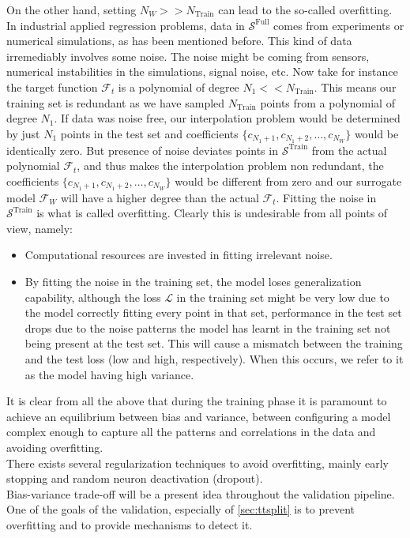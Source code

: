 \indent On the other hand, setting $N_W>>N_{\text{Train}}$ can lead to the so-called overfitting. In industrial applied regression problems, data in $\mathcal{S}^\text{Full}$ comes from experiments or numerical simulations, as has been mentioned before. This kind of data irremediably involves some noise. The noise might be coming from sensors, numerical instabilities in the simulations, signal noise, etc. Now take for instance the target function $\mathcal{F}_t$ is a polynomial of degree $N_1<<N_{\text{Train}}$. This means our training set is redundant as we have sampled $N_\text{Train}$ points from a polynomial of degree $N_1$. If data was noise free, our interpolation problem would be determined by just $N_1$ points in the test set and coefficients $\{c_{N_1+1},c_{N_1+2},\ldots,c_{N_W}\}$ would be identically zero. But presence of noise deviates points in $\mathcal{S}^\text{Train}$ from the actual polynomial $\mathcal{F}_t$, and thus makes the interpolation problem non redundant, \ie the coefficients $\{c_{N_1+1},c_{N_1+2},\ldots,c_{N_W}\}$ would be different from zero and our surrogate model $\mathcal{{F}}_W$ will have a higher degree than the actual $\mathcal{F}_t$. Fitting the noise in $\mathcal{S}^\text{Train}$ is what is called overfitting. Clearly this is undesirable from all points of view, namely:
\begin{itemize}
	\item Computational resources are invested in fitting irrelevant noise.
	\item By fitting the noise in the training set, the model loses generalization capability, \ie although the loss $\mathcal{L}$ in the training set might be very low due to the model correctly fitting every point in that set, performance in the test set drops due to the noise patterns the model has learnt in the training set not being present at the test set. This will cause a mismatch between the training and the test loss (low and high, respectively). When this occurs, we refer to it as the model having high variance.
\end{itemize}

It is clear from all the above that during the training phase it is paramount to achieve an equilibrium between bias and variance, \ie between configuring a model complex enough to capture all the patterns and correlations in the data and avoiding overfitting.\\
%
\indent There exists several regularization techniques to avoid overfitting, mainly early stopping and random neuron deactivation (dropout)\cite{Marsland2015Machine}.\\
%
\indent Bias-variance trade-off will be a present idea throughout the validation pipeline. One of the goals of the validation, especially of \autoref{sec:ttsplit} is to prevent overfitting and to provide mechanisms to detect it.

